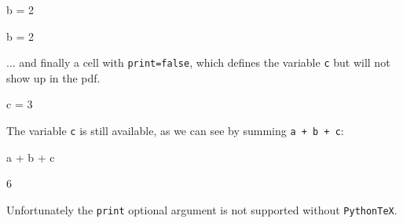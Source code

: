 \documentclass[oneside]{book}
\begin{document}
\ifPythonTeXLoaded
\begin{pycell}[print=true]
b = 2
\end{pycell}
\else
\begin{pycell}
b = 2
\end{pycell}
\fi

... and finally a cell with \texttt{print=false}, which defines the variable \texttt{c} but will not show up in the pdf.

\ifPythonTeXLoaded
\begin{pycell}[print=false]
c = 3
\end{pycell}
\else
\fi

The variable \texttt{c} is still available, as we can see by summing \texttt{a + b + c}:
\begin{pycell}
a + b + c
\end{pycell}
\begin{pyexpectedoutput}
6
\end{pyexpectedoutput}

Unfortunately the \texttt{print} optional argument is not supported without \texttt{PythonTeX}.
\end{document}
